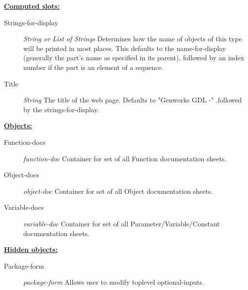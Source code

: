 \documentclass [11pt]{book}
\begin{document}
\begin{itemize}
\textbf{
\underline{Computed slots:}}

\begin{description}

\item [Strings-for-display]
\emph{String or List of Strings} Determines how the name of objects of this type will be printed in most places.
This defaults to the name-for-display (generally the part's name as specified in its
parent), followed by an index number if the part is an element of a sequence.


\item [Title]
\emph{String} The title of the web page. Defaults to "Genworks GDL -"
.followed by the strings-for-display.


\end{description}






\textbf{
\underline{Objects:}}

\begin{description}

\item [Function-docs]
\emph{function-doc} Container for set of all Function documentation sheets.


\item [Object-docs]
\emph{object-doc} Container for set of all Object documentation sheets.


\item [Variable-docs]
\emph{variable-doc} Container for set of all Parameter/Variable/Constant documentation sheets.


\end{description}






\textbf{
\underline{Hidden objects:}}

\begin{description}

\item [Package-form]
\emph{package-form} Allows user to modify toplevel optional-inputs.


\end{description}







\end{itemize}
\end{document}

